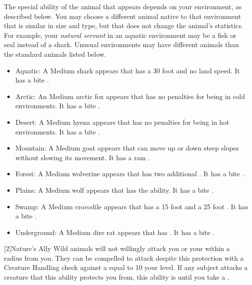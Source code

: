         The special ability of the animal that appears depends on your environment, as described below.
        You may choose a different animal native to that environment that is similar in size and type, but that does not change the animal's statistics.
        For example, your \textit{natural servant} in an aquatic environment may be a fish or seal instead of a shark.
        Unusual environments may have different animals than the standard animals listed below.
        \begin{itemize}
            \item Aquatic: A Medium shark appears that has a 30 foot  and no land speed.
                It has a bite .
            \item Arctic: An Medium arctic fox appears that has no penalties for being in cold environments.
                It has a bite .
            \item Desert: A Medium hyena appears that has no penalties for being in hot environments.
                It has a bite .
            \item Mountain: A Medium goat appears that can move up or down steep slopes without slowing its movement.
                It has a ram .
            \item Forest: A Medium wolverine appears that has two additional .
                It has a bite .
            \item Plains: A Medium wolf appears that has the  ability.
                It has a bite .
            \item Swamp: A Medium crocodile appears that has a 15 foot  and a 25 foot .
                It has a bite .
            \item Underground: A Medium dire rat appears that has .
                It has a bite .
        \end{itemize}

        [2]{Nature's Ally} Wild animals will not willingly attack you or your  within a \largearea radius  from you.
        They can be compelled to attack despite this protection with a Creature Handling check against a  equal to 10 \add your level.
        If any subject attacks a creature that this ability protects you from, this ability is  until you take a .

